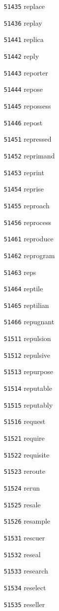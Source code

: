 \documentclass[twoside,11pt]{article}
\begin{document}
\begin{multicols}{5}
\begin{enumerate}
\item[\texttt{51435}] replace
\item[\texttt{51436}] replay
\item[\texttt{51441}] replica
\item[\texttt{51442}] reply
\item[\texttt{51443}] reporter
\item[\texttt{51444}] repose
\item[\texttt{51445}] repossess
\item[\texttt{51446}] repost
\item[\texttt{51451}] repressed
\item[\texttt{51452}] reprimand
\item[\texttt{51453}] reprint
\item[\texttt{51454}] reprise
\item[\texttt{51455}] reproach
\item[\texttt{51456}] reprocess
\item[\texttt{51461}] reproduce
\item[\texttt{51462}] reprogram
\item[\texttt{51463}] reps
\item[\texttt{51464}] reptile
\item[\texttt{51465}] reptilian
\item[\texttt{51466}] repugnant
\item[\texttt{51511}] repulsion
\item[\texttt{51512}] repulsive
\item[\texttt{51513}] repurpose
\item[\texttt{51514}] reputable
\item[\texttt{51515}] reputably
\item[\texttt{51516}] request
\item[\texttt{51521}] require
\item[\texttt{51522}] requisite
\item[\texttt{51523}] reroute
\item[\texttt{51524}] rerun
\item[\texttt{51525}] resale
\item[\texttt{51526}] resample
\item[\texttt{51531}] rescuer
\item[\texttt{51532}] reseal
\item[\texttt{51533}] research
\item[\texttt{51534}] reselect
\item[\texttt{51535}] reseller

\end{enumerate}
\end{multicols}
\end{document}
